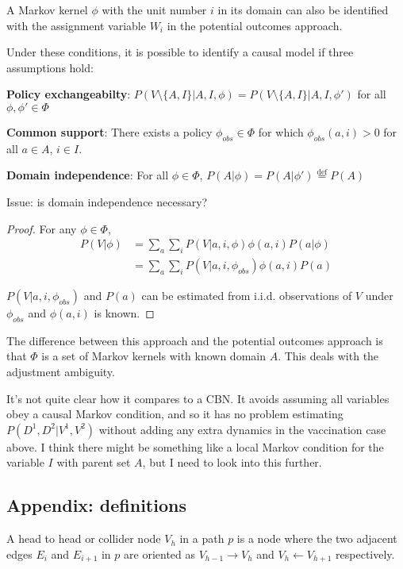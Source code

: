 A Markov kernel $\phi$ with the unit number $i$ in its domain can also be identified with the assignment variable $W_i$ in the potential outcomes approach. 

Under these conditions, it is possible to identify a causal model if three assumptions hold:

\textbf{Policy exchangeabilty}: $P(V\setminus\{A,I\}|A,I,\phi)=P(V\setminus\{A,I\}|A,I,\phi')$ for all $\phi,\phi' \in \Phi$

\textbf{Common support}: There exists a policy $\phi_{obs}\in\Phi$ for which $\phi_{obs}(a,i)>0$ for all $a\in A$, $i\in I$.

\textbf{Domain independence}: For all $\phi\in \Phi$, $P(A|\phi)=P(A|\phi')\overset{\mathrm{def}}{=}P(A)$

Issue: is domain independence necessary?

\begin{proof}
For any $\phi\in\Phi$,
\begin{align}
    P(V|\phi)&=\sum_{a}\sum_{i} P(V|a,i,\phi)\phi(a,i)P(a|\phi) \\
            &= \sum_{a}\sum_{i} P(V|a,i,\phi_{obs})\phi(a,i)P(a)
\end{align}

$P(V|a,i,\phi_{obs})$ and $P(a)$ can be estimated from i.i.d. observations of $V$ under $\phi_{obs}$ and $\phi(a,i)$ is known.

\end{proof}

The difference between this approach and the potential outcomes approach is that $\Phi$ is a set of Markov kernels with known domain $A$. This deals with the adjustment ambiguity. 

It's not quite clear how it compares to a CBN. It avoids assuming all variables obey a causal Markov condition, and so it has no problem estimating $P(D^1,D^2|V^1,V^2)$ without adding any extra dynamics in the vaccination case above. I think there might be something like a local Markov condition for the variable $I$ with parent set $A$, but I need to look into this further.

\subsection{Appendix: definitions}


\begin{definition}
A head to head or collider node $V_{h}$ in a path $p$ is a node where the two adjacent edges $E_i$ and $E_{i+1}$ in $p$ are oriented as $V_{h-1}\rightarrow V_h$ and $V_h\leftarrow V_{h+1}$ respectively.
\end{definition}

